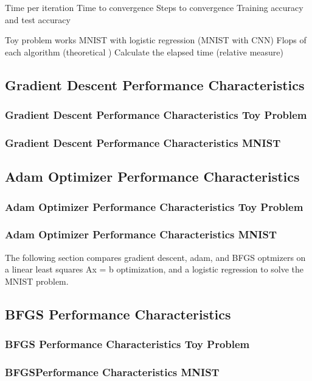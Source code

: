\documentclass[10pt,twocolumn]{article}
\begin{document}
Time per iteration
Time to convergence 
Steps to convergence
Training accuracy and test accuracy 

Toy problem works
MNIST with logistic regression
(MNIST with CNN)
Flops of each algorithm (theoretical )
Calculate the elapsed time (relative measure)


\subsection{Gradient Descent Performance Characteristics}
\subsubsection{Gradient Descent Performance Characteristics Toy Problem}
\subsubsection{Gradient Descent Performance Characteristics MNIST}

\subsection{Adam Optimizer Performance Characteristics}
\subsubsection{Adam Optimizer Performance Characteristics Toy Problem}
\subsubsection{Adam Optimizer Performance Characteristics MNIST}
The following section compares gradient descent, adam, and BFGS optmizers on a linear least squares Ax = b optimization, and a logistic regression to solve the MNIST problem.


\subsection{BFGS Performance Characteristics}
\subsubsection{BFGS Performance Characteristics Toy Problem}
\subsubsection{BFGSPerformance Characteristics MNIST}
\end{document}
